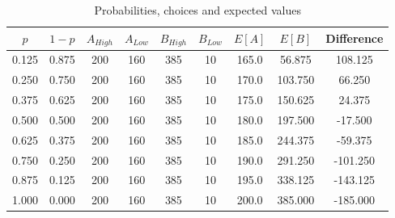 \begin{table}[H]
  \centering
  \caption{Probabilities, choices and expected values}
    \begin{tabular}{ccccccccc}
      \toprule
         $p$ &  $1-p$ & $A_{High}$ & $A_{Low}$ & $B_{High}$ & $B_{Low}$ & $E[A]$ &   $E[B]$ & Difference \\
      \midrule
       0.125 &  0.875 &        200 &       160 &        385 &        10 &  165.0 &   56.875 &    108.125 \\
       0.250 &  0.750 &        200 &       160 &        385 &        10 &  170.0 &  103.750 &     66.250 \\
       0.375 &  0.625 &        200 &       160 &        385 &        10 &  175.0 &  150.625 &     24.375 \\
       0.500 &  0.500 &        200 &       160 &        385 &        10 &  180.0 &  197.500 &    -17.500 \\
       0.625 &  0.375 &        200 &       160 &        385 &        10 &  185.0 &  244.375 &    -59.375 \\
       0.750 &  0.250 &        200 &       160 &        385 &        10 &  190.0 &  291.250 &   -101.250 \\
       0.875 &  0.125 &        200 &       160 &        385 &        10 &  195.0 &  338.125 &   -143.125 \\
       1.000 &  0.000 &        200 &       160 &        385 &        10 &  200.0 &  385.000 &   -185.000 \\
      \bottomrule
    \end{tabular}
\end{table}